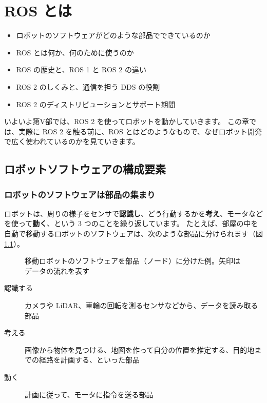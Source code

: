 \chapter{ROS とは}
\label{chap:what_is_ros}

\begin{goalbox}
  \begin{itemize}
    \item ロボットのソフトウェアがどのような部品でできているのか
    \item ROS とは何か、何のために使うのか
    \item ROS の歴史と、ROS 1 と ROS 2 の違い
    \item ROS 2 のしくみと、通信を担う DDS の役割
    \item ROS 2 のディストリビューションとサポート期間
  \end{itemize}
\end{goalbox}

いよいよ第V部では、ROS 2 を使ってロボットを動かしていきます。
この章では、実際に ROS 2 を触る前に、ROS とはどのようなもので、なぜロボット開発で広く使われているのかを見ていきます。

\section{ロボットソフトウェアの構成要素}
\label{sec:what-is-ros-components}

\subsection{ロボットのソフトウェアは部品の集まり}

ロボットは、周りの様子をセンサで\textbf{認識し}、どう行動するかを\textbf{考え}、モータなどを使って\textbf{動く}、という 3 つのことを繰り返しています。
たとえば、部屋の中を自動で移動するロボットのソフトウェアは、次のような部品に分けられます（図\ref{fig:what-is-ros-nodes}）。

\begin{figure}[tb]
  \centering
  
  \caption{移動ロボットのソフトウェアを部品（ノード）に分けた例。矢印はデータの流れを表す}
  \label{fig:what-is-ros-nodes}
\end{figure}

\begin{description}
  \item[認識する] カメラや LiDAR、車輪の回転を測るセンサなどから、データを読み取る部品
  \item[考える] 画像から物体を見つける、地図を作って自分の位置を推定する、目的地までの経路を計画する、といった部品
  \item[動く] 計画に従って、モータに指令を送る部品
\end{description}

